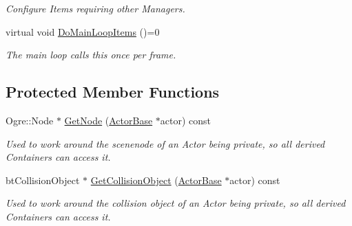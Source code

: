 \begin{DoxyCompactItemize}
\begin{DoxyCompactList}\small\item\em Configure Items requiring other Managers. \item\end{DoxyCompactList}\item 
virtual void \hyperlink{classphys_1_1ActorContainerBase_a67fbde6a61602253f66fecd0416bdc2f}{DoMainLoopItems} ()=0
\begin{DoxyCompactList}\small\item\em The main loop calls this once per frame. \item\end{DoxyCompactList}\end{DoxyCompactItemize}
\subsection*{Protected Member Functions}
\begin{DoxyCompactItemize}
\item 
Ogre::Node $\ast$ \hyperlink{classphys_1_1ActorContainerBase_a9813fe23051cc1a324bfedd4d35d27ad}{GetNode} (\hyperlink{classphys_1_1ActorBase}{ActorBase} $\ast$actor) const 
\begin{DoxyCompactList}\small\item\em Used to work around the scenenode of an Actor being private, so all derived Containers can access it. \item\end{DoxyCompactList}\item 
btCollisionObject $\ast$ \hyperlink{classphys_1_1ActorContainerBase_a3f3d84f7775d2e8597290e214fedd5f9}{GetCollisionObject} (\hyperlink{classphys_1_1ActorBase}{ActorBase} $\ast$actor) const 
\begin{DoxyCompactList}\small\item\em Used to work around the collision object of an Actor being private, so all derived Containers can access it. \item\end{DoxyCompactList}\end{DoxyCompactItemize}


